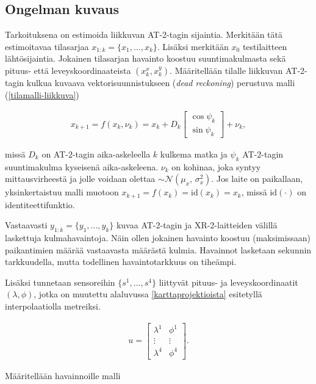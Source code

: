 \documentclass[
  12pt,
  a4paper, twoside]{book}
\begin{document}
\subsection{Ongelman kuvaus} \label{ongelman-kuvaus}

Tarkoituksena on estimoida liikkuvan AT-2-tagin sijaintia. Merkitään tätä estimoitavaa tilasarjaa \(x_{1:k}=\{x_1,\ldots,x_k\}\). Lisäksi merkitään \(x_0\) testilaitteen lähtösijaintia. Jokainen tilasarjan havainto koostuu suuntimakulmasta sekä pituus- että leveyskoordinaateista \((x_k^x, x_k^y)\). Määritellään tilalle liikkuvan AT-2-tagin kulkua kuvaava vektorisuunnistukseen (\emph{dead reckoning}) perustuva malli (\ref{tilamalli-liikkuva})

\begin{align}\label{tilamalli-liikkuva}
x_{k+1}=f(x_k, \nu_k)=x_k+D_k \begin{bmatrix} \cos\psi_k \\ \sin\psi_k \end{bmatrix}+\nu_k,
\end{align}

\noindent missä \(D_k\) on AT-2-tagin aika-askeleella \(k\) kulkema matka ja \(\psi_k\) AT-2-tagin suuntimakulma kyseisenä aika-askeleena. \(\nu_k\) on kohinaa, joka syntyy mittausvirheestä ja jolle voidaan olettaa \(\sim \mathcal{N}(\mu_x,\,\sigma_x^{2})\). Jos laite on paikallaan, yksinkertaistuu malli muotoon \(x_{k+1}=f(x_k)=\text{id}(x_k)=x_k\), missä \(\text{id}(\cdot)\) on identiteettifunktio.

Vastaavasti \(y_{1:k}=\{y_1,\ldots,y_k\}\) kuvaa AT-2-tagin ja XR-2-laitteiden välillä laskettuja kulmahavaintoja. Näin ollen jokainen havainto koostuu (maksimissaan) paikantimien määrää vastaavasta määrästä kulmia. Havainnot lasketaan sekunnin tarkkuudella, mutta todellinen havaintotarkkuus on tiheämpi.

\noindent Lisäksi tunnetaan sensoreihin \(\{s^1,\ldots,s^4\}\) liittyvät pituus- ja leveyskoordinaatit \((\lambda, \phi)\), jotka on muutettu alaluvussa \ref{karttaprojektioista} esitetyllä interpolaatiolla metreiksi.

\begin{align}
u=\begin{bmatrix} \lambda^1 & \phi^1 \\   \vdots & \vdots \\ \lambda^4 & \phi^4 \end{bmatrix}.
\end{align}

Määritellään havainnoille malli
\end{document}
